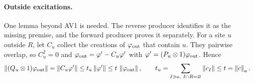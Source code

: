 \paragraph{Outside excitations.}
One lemma beyond AV1 is needed. The reverse producer identifies it as the
missing premise, and the forward producer proves it separately. For a site
$u$ outside $R$, let $C_u$ collect the creations of $\varphi_{\rm out}$ that
contain $u$. They pairwise overlap, so $C_u^2=0$ and
$\varphi_{\rm out}=\varphi'-C_u\varphi'$ with
$\varphi'=(P_u\otimes1)\varphi_{\rm out}$. Hence
\begin{equation}
 \left\lVert(Q_u\otimes1)\varphi_{\rm out}\right\rVert=\left\lVert C_u\varphi'\right\rVert\le t_u\left\lVert\varphi'\right\rVert
 \le t\,\left\lVert\varphi_{\rm out}\right\rVert,\qquad
 t_u=\sum_{I\ni u,\ I\cap R=\varnothing}\left\lVert c_I\right\rVert\le t=\left\lVert c\right\rVert_a .
 \label{eq:aw1-outside}
\end{equation}

